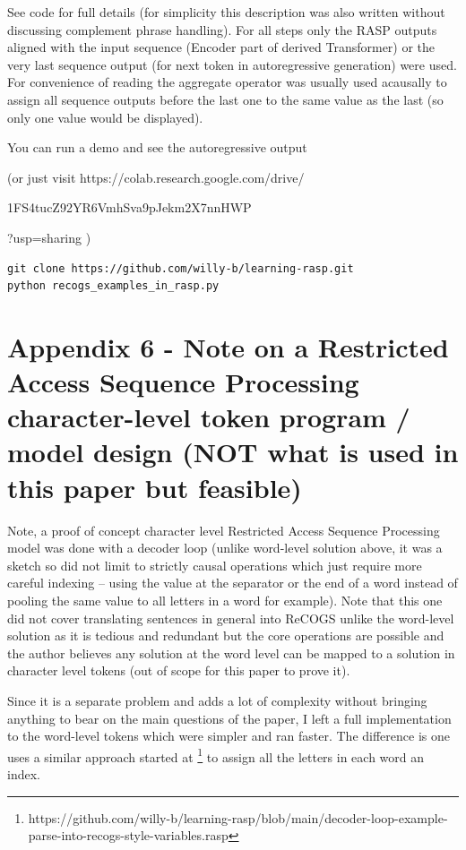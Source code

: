 \documentclass[11pt]{article}
\begin{document}
See code for full details (for simplicity this description was also written without discussing complement phrase handling). For all steps only the RASP outputs aligned with the input sequence (Encoder part of derived Transformer) or the very last sequence output (for next token in autoregressive generation) were used. For convenience of reading the aggregate operator was usually used acausally to assign all sequence outputs before the last one to the same value as the last (so only one value would be displayed).

You can run a demo and see the autoregressive output 

(or just visit https://colab.research.google.com/drive/

1FS4tucZ92YR6VmhSva9pJekm2X7nnHWP

?usp=sharing  )

\begin{tiny}
\begin{verbatim}
git clone https://github.com/willy-b/learning-rasp.git
python recogs_examples_in_rasp.py
\end{verbatim}
\end{tiny}

\clearpage

\section{Appendix 6 - Note on a Restricted Access Sequence Processing character-level token program / model design (NOT what is used in this paper but feasible)}

Note, a proof of concept character level Restricted Access Sequence Processing model was done with a decoder loop (unlike word-level solution above, it was a sketch so did not limit to strictly causal operations which just require more careful indexing -- using the value at the separator or the end of a word instead of pooling the same value to all letters in a word for example). Note that this one did not cover translating sentences in general into ReCOGS unlike the word-level solution as it is tedious and redundant but the core operations are possible and the author believes any solution at the word level can be mapped to a solution in character level tokens (out of scope for this paper to prove it).

Since it is a separate problem and adds a lot of complexity without bringing anything to bear on the main questions of the paper, I left a full implementation to the word-level tokens which were simpler and ran faster. The difference is one uses a similar approach started at \footnote{ https://github.com/willy-b/learning-rasp/blob/main/decoder-loop-example-parse-into-recogs-style-variables.rasp } to assign all the letters in each word an index. 
\end{document}
